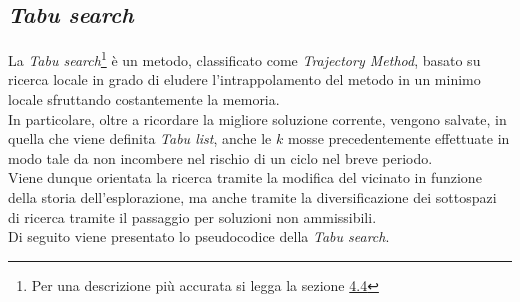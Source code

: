 \subsection{\textit{Tabu search}}
\noindent La \textit{Tabu search}\footnote[3]{Per una descrizione più accurata si legga la sezione \hyperref[sec:tabu-search]{4.4}} è un metodo, classificato come \textit{Trajectory Method}, basato su ricerca locale
in grado di eludere l'intrappolamento del metodo in un minimo locale sfruttando costantemente la memoria.\\
In particolare, oltre a ricordare la migliore soluzione corrente, vengono salvate, in quella che viene definita \textit{Tabu list},
anche le {$k$} mosse precedentemente effettuate in modo tale da non incombere nel rischio di un ciclo nel breve periodo.\\
Viene dunque orientata la ricerca tramite la modifica del vicinato in funzione della storia dell'esplorazione, ma anche tramite la diversificazione dei sottospazi di ricerca tramite il passaggio per soluzioni non ammissibili.\\
Di seguito viene presentato lo pseudocodice della \textit{Tabu search}.
